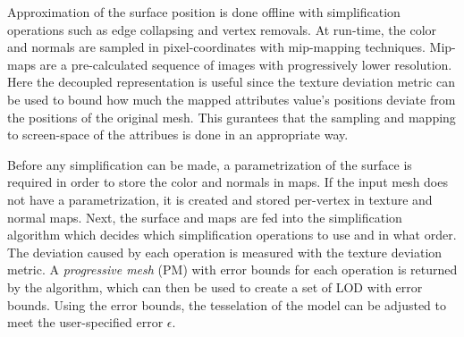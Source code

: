 Approximation of the surface position is done offline with simplification operations such as edge collapsing and vertex removals. At run-time, the color and normals are sampled in pixel-coordinates with mip-mapping techniques. Mip-maps are a pre-calculated sequence of images with progressively lower resolution. Here the decoupled representation is useful since the texture deviation metric can be used to bound how much the mapped attributes value's positions deviate from the positions of the original mesh. This gurantees that the sampling and mapping to screen-space of the attribues is done in an appropriate way.

Before any simplification can be made, a parametrization of the surface is required in order to store the color and normals in maps. If the input mesh does not have a parametrization, it is created and stored per-vertex in texture and normal maps. Next, the surface and maps are fed into the simplification algorithm which decides which simplification operations to use and in what order. The deviation caused by each operation is measured with the texture deviation metric. A \emph{progressive mesh} (PM) with error bounds for each operation is returned by the algorithm, which can then be used to create a set of LOD with error bounds. Using the error bounds, the tesselation of the model can be adjusted to meet the user-specified error $\epsilon$.

